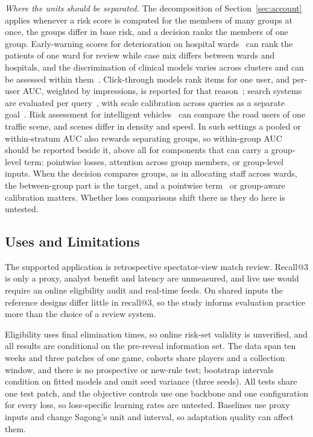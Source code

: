 \documentclass[sigconf,anonymous]{acmart}
\begin{document}
\emph{Where the units should be separated.} The decomposition of Section~\ref{sec:account} applies whenever a risk score is computed for the members of many groups at once, the groups differ in base risk, and a decision ranks the members of one group. Early-warning scores for deterioration on hospital wards~\cite{Churpek16} can rank the patients of one ward for review while case mix differs between wards and hospitals, and the discrimination of clinical models varies across clusters and can be assessed within them~\cite{vanKlaveren14,Riley16}. Click-through models rank items for one user, and per-user AUC, weighted by impressions, is reported for that reason~\cite{Zhou18}; search systems are evaluated per query~\cite{Jarvelin02}, with scale calibration across queries as a separate goal~\cite{Yan22,Bai23}. Risk assessment for intelligent vehicles~\cite{Lefevre14} can compare the road users of one traffic scene, and scenes differ in density and speed. In such settings a pooled or within-stratum AUC also rewards separating groups, so within-group AUC should be reported beside it, above all for components that can carry a group-level term: pointwise losses, attention across group members, or group-level inputs. When the decision compares groups, as in allocating staff across wards, the between-group part is the target, and a pointwise term~\cite{Bai23} or group-aware calibration matters. Whether loss comparisons shift there as they do here is untested.

\subsection{Uses and Limitations}
\label{sec:discussion:limits}
The supported application is retrospective spectator-view match review. Recall@3 is only a proxy, analyst benefit and latency are unmeasured, and live use would require an online eligibility audit and real-time feeds. On shared inputs the reference designs differ little in recall@3, so the study informs evaluation practice more than the choice of a review system.

Eligibility uses final elimination times, so online risk-set validity is unverified, and all results are conditional on the pre-reveal information set. The data span ten weeks and three patches of one game, cohorts share players and a collection window, and there is no prospective or new-rule test; bootstrap intervals condition on fitted models and omit seed variance (three seeds). All tests share one test patch, and the objective controls use one backbone and one configuration for every loss, so loss-specific learning rates are untested. Baselines use proxy inputs and change Sagong's unit and interval, so adaptation quality can affect them.
\end{document}
